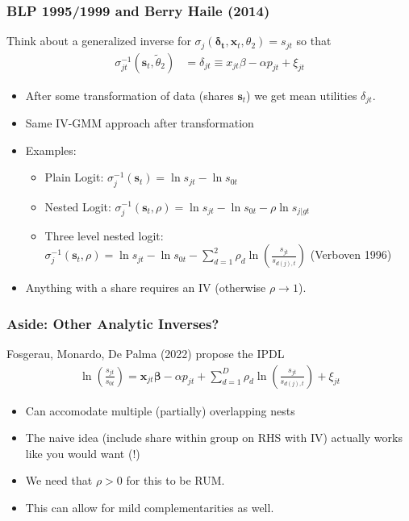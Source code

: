 \documentclass[aspectratio=169,10pt]{beamer}
\begin{document}
\begin{frame}
\frametitle{BLP 1995/1999 and Berry Haile (2014)}
Think about a \alert{generalized inverse} for $\sigma_{j}(\symbf{\delta_{t}}, \symbf{x}_t,\theta_2) = s_{jt}$ so that 
\begin{align*}
 \sigma_{jt}^{-1}(\symbf{s}_t,\widetilde{\theta}_2)&= \delta_{jt} \equiv x_{jt} \beta -\alpha p_{jt} +  \xi_{jt} 
\end{align*}
 \begin{itemize}
\item After some transformation of data (shares $\symbf{s}_t$) we get \alert{mean utilities} $\delta_{jt}$.
\item Same IV-GMM approach after transformation
\item Examples:
\begin{itemize}
\item Plain Logit: $\sigma_{j}^{-1}(\symbf{s}_t) = \ln s_{jt}- \ln s_{0t}$
\item Nested Logit: $\sigma_{j}^{-1}(\symbf{s}_t,\rho) = \ln s_{jt}- \ln s_{0t} - \rho  \ln s_{j|gt}$
\item Three level nested logit: $\sigma_{j}^{-1}(\symbf{s}_t,\rho) = \ln s_{jt}- \ln s_{0t} -\sum_{d=1}^2 \rho_d \ln \left(\frac{s_{j t}}{s_{d(j), t}}\right)$ (Verboven 1996)
 \end{itemize}
 \item Anything with a share requires an IV (otherwise $\rho \rightarrow 1$).
 \end{itemize}
\end{frame}


\begin{frame}
\frametitle{Aside: Other Analytic Inverses?}
Fosgerau, Monardo, De Palma (2022) propose the IPDL
\begin{align*}
\ln \left(\frac{s_{j t}}{s_{0 t}}\right)=\symbf{x}_{j t} \symbf{\beta}-\alpha p_{j t}+\sum_{d=1}^D \rho_d \ln \left(\frac{s_{j t}}{s_{d(j), t}}\right)+\xi_{j t}
\end{align*}
 \begin{itemize}
\item Can accomodate multiple (partially) overlapping nests
\item The naive idea (include share within group on RHS with IV) actually works like you would want (!)
\item We need that $\rho > 0$ for this to be RUM.
\item This can allow for mild complementarities as well.
 \end{itemize}
\end{frame}
\end{document}
